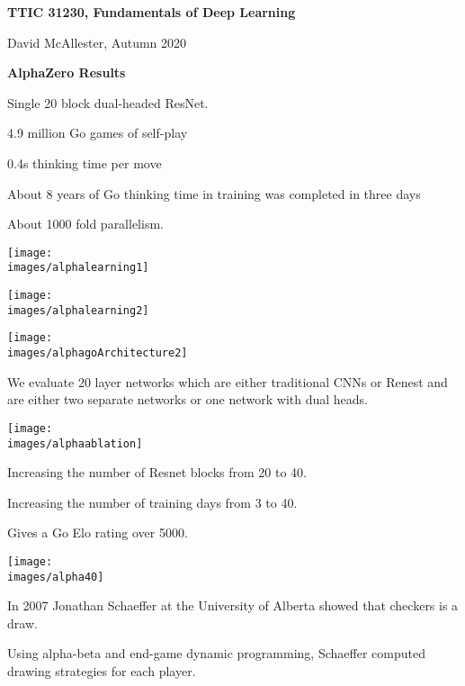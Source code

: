 




{\Huge

  \centerline{\bf TTIC 31230, Fundamentals of Deep Learning}
  \bigskip
  \centerline{David McAllester, Autumn 2020}

  \vfill
  \centerline{\bf AlphaZero Results}
  \vfill
  \vfill


Single 20 block dual-headed ResNet.

\vfill
4.9 million Go games of self-play

\vfill
0.4s thinking time per move

\vfill
About 8 years of Go thinking time in training was completed in three days

\vfill
About 1000 fold parallelism.


\centerline{\texttt{[image: \\images/alphalearning1]}}


\centerline{\texttt{[image: \\images/alphalearning2]}}


\centerline{\texttt{[image: \\images/alphagoArchitecture2]}}

\vfill
We evaluate 20 layer networks which are either traditional CNNs or Renest and are either two separate networks or one network with dual heads.


\centerline{\texttt{[image: \\images/alphaablation]}}


Increasing the number of Resnet blocks from 20 to 40.

\vfill
Increasing the number of training days from 3 to 40.

\vfill
Gives a Go Elo rating over 5000.


\centerline{\texttt{[image: \\images/alpha40]}}


In 2007 Jonathan Schaeffer at the University of Alberta showed that checkers is a draw.

\vfill
Using alpha-beta and end-game dynamic programming, Schaeffer computed drawing strategies for each player.

}
